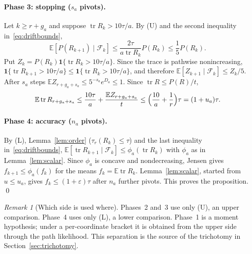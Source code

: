 \documentclass[11pt]{article}
\theoremstyle{definition}\newtheorem{definition}[theorem]{Definition}
\theoremstyle{remark}\newtheorem{remark}[theorem]{Remark}
\newcommand{\E}{\mathbb E}
\newcommand{\eps}{\varepsilon}
\newcommand{\tr}{\operatorname{tr}}
\newcommand{\calF}{\mathcal F}
\newcommand{\1}{\mathbf 1}
\begin{document}
\paragraph{Phase 3: stopping ($s_a$ pivots).}
Let $k\ge r+g_a$ and suppose $\tr R_k>10\tau/a$. By (U) and the second
inequality in~\eqref{eq:driftbounds},
\[
 \E[P(R_{k+1})\mid\calF_k]\le\frac{2\tau}{a\tr R_k}P(R_k)\le\frac15P(R_k).
\]
Put $Z_k=P(R_k)\1\{\tr R_k>10\tau/a\}$. Since the trace is pathwise
nonincreasing, $\1\{\tr R_{k+1}>10\tau/a\}\le\1\{\tr R_k>10\tau/a\}$,
and therefore $\E[Z_{k+1}\mid\calF_k]\le Z_k/5$. After $s_a$ steps
$\E Z_{r+g_a+s_a}\le5^{-s_a}e^{D_a}\le1$. Since $\tr R\le P(R)/t$,
\[
 \E\tr R_{r+g_a+s_a}\le\frac{10\tau}a+\frac{\E Z_{r+g_a+s_a}}t
 \le\Bigl(\frac{10}a+\frac1r\Bigr)\tau=(1+u_a)\tau .
\]

\paragraph{Phase 4: accuracy ($n_a$ pivots).}
By (L), Lemma~\ref{lem:order} ($\tau_r(R_k)\le\tau$) and the last
inequality in~\eqref{eq:driftbounds},
$\E[\tr R_{k+1}\mid\calF_k]\le\phi_a(\tr R_k)$ with $\phi_a$ as in
Lemma~\ref{lem:scalar}. Since $\phi_a$ is concave and nondecreasing,
Jensen gives $f_{k+1}\le\phi_a(f_k)$ for the means $f_k=\E\tr R_k$.
Lemma~\ref{lem:scalar}, started from $u\le u_a$, gives
$f_k\le(1+\eps)\tau$ after $n_a$ further pivots. This proves the
proposition. \qed

\begin{remark}[Which side is used where]\label{rem:sides}
Phases~2 and~3 use only (U), an upper comparison. Phase~4 uses only (L),
a lower comparison. Phase~1 is a moment hypothesis; under a
per-coordinate bracket it is obtained from the upper side through the
path likelihood. This separation is the source of the trichotomy in
Section~\ref{sec:trichotomy}.
\end{remark}
\end{document}

